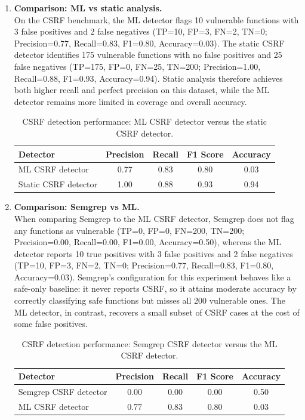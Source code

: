\begin{enumerate}
  \item \textbf{Comparison: ML vs static analysis.}\\
  On the CSRF benchmark, the ML detector flags 10 vulnerable functions with 3 false
  positives and 2 false negatives (TP=10, FP=3, FN=2, TN=0; Precision=0.77, Recall=0.83,
  F1=0.80, Accuracy=0.03). The static CSRF detector identifies 175 vulnerable functions
  with no false positives and 25 false negatives (TP=175, FP=0, FN=25, TN=200;
  Precision=1.00, Recall=0.88, F1=0.93, Accuracy=0.94). Static analysis therefore achieves
  both higher recall and perfect precision on this dataset, while the ML detector remains
  more limited in coverage and overall accuracy.

  \begin{table}[htbp]
    \centering
    \small
    \begin{tabular}{lcccc}
      \textbf{Detector} & \textbf{Precision} & \textbf{Recall} & \textbf{F1 Score} & \textbf{Accuracy} \\
      \hline
      ML CSRF detector & 0.77 & 0.83 & 0.80 & 0.03 \\
      Static CSRF detector & 1.00 & 0.88 & 0.93 & 0.94 \\
    \end{tabular}
    \caption{CSRF detection performance: ML CSRF detector versus the static CSRF detector.}
    \label{tab:csrf_ml_vs_static}
  \end{table}

  \item \textbf{Comparison: Semgrep vs ML.}\\
  When comparing Semgrep to the ML CSRF detector, Semgrep does not flag any functions
  as vulnerable (TP=0, FP=0, FN=200, TN=200; Precision=0.00, Recall=0.00, F1=0.00,
  Accuracy=0.50), whereas the ML detector reports 10 true positives with 3 false
  positives and 2 false negatives (TP=10, FP=3, FN=2, TN=0; Precision=0.77, Recall=0.83,
  F1=0.80, Accuracy=0.03). Semgrep's configuration for this experiment behaves like a
  safe-only baseline: it never reports CSRF, so it attains moderate accuracy by correctly
  classifying safe functions but misses all 200 vulnerable ones. The ML detector, in
  contrast, recovers a small subset of CSRF cases at the cost of some false positives.

  \begin{table}[htbp]
    \centering
    \small
    \begin{tabular}{lcccc}
      \textbf{Detector} & \textbf{Precision} & \textbf{Recall} & \textbf{F1 Score} & \textbf{Accuracy} \\
      \hline
      Semgrep CSRF detector & 0.00 & 0.00 & 0.00 & 0.50 \\
      ML CSRF detector & 0.77 & 0.83 & 0.80 & 0.03 \\
    \end{tabular}
    \caption{CSRF detection performance: Semgrep CSRF detector versus the ML CSRF detector.}
    \label{tab:csrf_semgrep_vs_ml}
  \end{table}


\end{enumerate}
